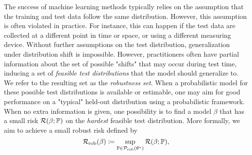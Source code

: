 
The success of machine learning methods typically relies on the assumption that the training and test data follow the same distribution. However, this assumption is often violated in practice. For instance, this can happen if the test data are collected at a different point in time or space, or using a different measuring device.
Without further assumptions on the test distribution, 
generalization under distribution shift is impossible.
However, practitioners often have partial information about the 
set of possible "shifts" 
that may occur during test time, inducing a set of \emph{feasible test distributions} that the model should generalize to. We refer to the resulting set as the \emph{robustness set}. 
When a probabilistic model for these possible test distributions is available or estimable, one may aim 
for good performance on a "typical" held-out distribution using a probabilistic framework. %
When no extra information is given, one possibility is to find a model $\beta$ that has a small risk $\mathcal{R}(\beta;\mathbb{P})$ on the \emph{hardest} feasible test distribution. More formally, we aim to achieve a small
robust risk defined by
\begin{equation}\label{eq:conventional-robust-risk}
   \mathcal{R}_{\mathrm{rob}}(\beta) \coloneqq \sup_{\mathbb{P} \in \mathcal{P}_{\text{rob}}(\theta^{\star})} \mathcal{R} (\beta; \mathbb{P}),
\end{equation}
